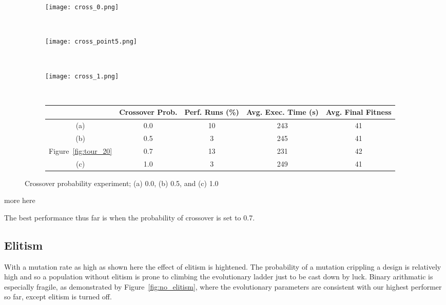 \begin{figure}
	\centering
	\begin{subfigure}[ht]{0.49\textwidth}
		\texttt{[image: cross\_0.png]}
		\caption{}
		\label{fig:cross_0}
		\vspace{1em}
	\end{subfigure}
	~
	\begin{subfigure}[ht]{0.49\textwidth}
		\texttt{[image: cross\_point5.png]}
		\caption{}
		\label{fig:cross_point5}
		\vspace{1em}
	\end{subfigure}
	~
	\begin{subfigure}[ht]{0.49\textwidth}
		\texttt{[image: cross\_1.png]}
		\caption{}
		\label{fig:cross_1}
		\vspace{1em}
	\end{subfigure}
	~
	\begin{subfigure}[ht]{\textwidth}
		\centering
		\begin{tabular}{ccccc}
			\toprule
			& \bfseries{Crossover Prob.} &
			\bfseries{Perf. Runs (\%)} &
			\bfseries{Avg. Exec. Time (s)} & \bfseries{Avg. Final Fitness}\\
			\midrule
			(a) & 0.0 & 10 & 243 & 41\\
			(b) & 0.5 & 3 & 245 & 41\\
			Figure~\ref{fig:tour_20} & 0.7 & 13 & 231 & 42 \\
			(c) & 1.0 & 3 & 249 & 41\\
			\bottomrule
		\end{tabular}
	\end{subfigure}

	\caption[Crossover probability experiment]{Crossover probability experiment;
	(a) 0.0, (b) 0.5, and (c) 1.0}
	\label{fig:cross}
\end{figure}

\todo more here

The best performance thus far is when the probability of crossover is set
to 0.7.

\subsection{Elitism}
With a mutation rate as high as shown here the effect of elitism is hightened.
The probability of a mutation crippling a design is relatively high and so a population
without elitism is prone to climbing the evolutionary ladder just to be cast
down by luck. Binary arithmatic is especially fragile, as demonstrated by Figure~\ref{fig:no_elitism},
where the evolutionary parameters are consistent with our highest performer so far, except
elitism is turned off.

